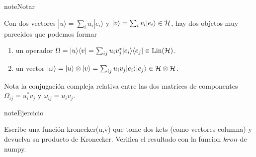 \documentclass[letterpaper,10pt,english]{jupyterBook}
\newcommand{\ket}[1]{|#1\rangle}
\newcommand{\ketbra}[2]{| #1\rangle \langle #2 |}
\newcommand{\Hil}{{\cal H}}
\newcommand{\Lin}{\hbox{Lin}}
\begin{document}
\begin{sphinxadmonition}{note}{Notar}

\sphinxAtStartPar
Con dos vectores \(\ket{u} = \sum_i u_i \ket{e_i}\) y \(\ket{v} = \sum_i v_i \ket{e_i} \in \Hil\), hay dos objetos muy parecidos que podemos formar
\begin{enumerate}
%
\item {} 
\sphinxAtStartPar
un operador \(\Omega = \ketbra{u}{v} = \sum_{ij}u_i v^*_j\ketbra{e_i}{e_j} \in \Lin(\Hil)\).

\item {} 
\sphinxAtStartPar
un vector \(\ket{\omega} = \ket{u}\otimes \ket{v} = \sum_{ij} u_i v_j \ket{e_i} \ket{e_j} \in \Hil\otimes \Hil\).

\end{enumerate}

\sphinxAtStartPar
Nota la conjugación compleja relativa entre las dos matrices de componentes \(\Omega_{ij} = u^*_i v_j\) y \(\omega_{ij} =  u_i v_j\).
\end{sphinxadmonition}

\begin{sphinxadmonition}{note}{Ejercicio}

\sphinxAtStartPar
Escribe una función  kronecker(u,v) que tome dos kets (como vectores columna)  y devuelva su producto de Kronecker. Verifica el resultado con la funcion \(kron\) de numpy.
\end{sphinxadmonition}
\end{document}
